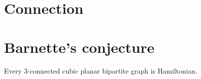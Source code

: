 \section{Connection}

\section{Barnette's conjecture}

\begin{conj}
  Every 3-connected cubic planar bipartite graph is Hamiltonian.
\end{conj}
